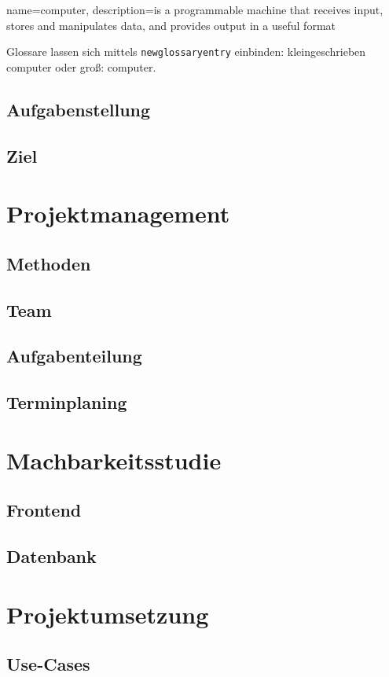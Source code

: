 \documentclass[medt,2017]{hitda}
\begin{document}
{
  name=computer,
  description={is a programmable machine that receives input,
               stores and manipulates data, and provides
               output in a useful format}
}


Glossare lassen sich mittels \verb|newglossaryentry| einbinden: 
kleingeschrieben \gls{computer} oder groß: \Gls{computer}.


\section{Aufgabenstellung}
\section{Ziel}

\chapter{Projektmanagement}
\section{Methoden}
\section{Team}
\section{Aufgabenteilung}
\section{Terminplaning}

\chapter{Machbarkeitsstudie}
\section{Frontend}
\section{Datenbank}

\chapter{Projektumsetzung}
\section{Use-Cases}
\end{document}
